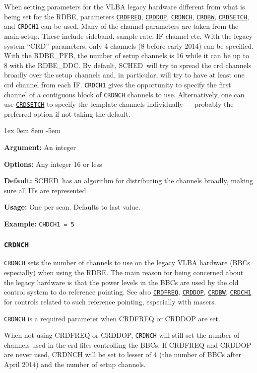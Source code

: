\documentclass{report}
\newcommand{\schedb}{{\sc SCHED~}}
\newcommand{\rcwbox}[5]{
  \begin{list}{}{\parsep 1ex  \itemsep 0em
                 \leftmargin 8em  \itemindent -5em }
    \item {\bf Argument:} #1
    \item {\bf Options:}  #2
    \item {\bf Default:}  #3
    \item {\bf Usage:}    #4
    \item {\bf Example:}  #5
  \end{list}
}
\begin{document}
When setting parameters for the VLBA legacy hardware different from
what is being set for the RDBE, parameters 
{\hyperref[MP:CRDFREQ]{{\tt CRDFREQ}}}, 
{\hyperref[MP:CRDDOP]{{\tt CRDDOP}}},
{\hyperref[MP:CRDNCH]{{\tt CRDNCH}}}, 
{\hyperref[MP:CRDBW]{{\tt CRDBW}}}, 
{\hyperref[MP:CRDSETCH]{{\tt CRDSETCH}}}, and 
{\tt CRDCH1} can be used.  Many of the channel parameters are taken
from the main setup.  These include sideband, sample rate, IF channel
etc.  With the legacy system ``CRD'' parameters, only 4 channels (8
before early 2014) can be specified.  With the RDBE\_PFB, the number
of setup channels is 16 while it can be up to 8 with the RDBE\_DDC.
By default, \schedb will try to spread the crd channels broadly over
the setup channels and, in particular, will try to have at least one
crd channel from each IF.  {\tt CRDCH1} gives the opportunity to
specify the first channel of a contiguous block of {\tt CRDNCH}
channels to use.  Alternatively, one can use 
{\hyperref[MP:CRDSETCH]{{\tt CRDSETCH}}}
to specify the template channels individually
--- probably the preferred option if not taking the default.

\rcwbox
{An integer}
{Any integer 16 or less}
{\schedb has an algorithm for distributing the channels broadly, 
making sure all IFs are represented.}
{One per scan.  Defaults to last value.}
{{\tt CHDCH1 = 5}}

\subsubsection{\label{MP:CRDNCH}{\tt CRDNCH}}

{\tt CRDNCH} sets the number of channels to use on the legacy VLBA
hardware (BBCs especially) when using the RDBE.  The main reason for
being concerned about the legacy hardware is that the power levels in
the BBCs are used by the old control system to do reference pointing.
See also 
{\hyperref[MP:CRDFREQ]{{\tt CRDFREQ}}}, 
{\hyperref[MP:CRDDOP]{{\tt CRDDOP}}}, 
{\hyperref[MP:CRDBW]{{\tt CRDBW}}}, 
{\hyperref[MP:CRDCH1]{{\tt CRDCH1}}}
for controls related to such reference pointing,
especially with masers.

{\tt CRDNCH} is a required parameter when CRDFREQ or CRDDOP are set.

When not using CRDFREQ or CRDDOP, {\tt CRDNCH} will still set the number 
of channels used in the crd files controlling the BBCs.  If CRDFREQ and 
CRDDOP are never used, CRDNCH will be set to lesser of 4 (the number of
BBCs after April 2014) and the number of setup channels.
\end{document}
